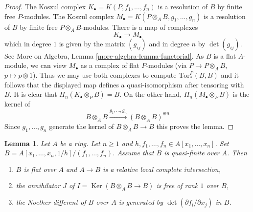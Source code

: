 \documentclass{stacks-project}
\theoremstyle{plain}
\newtheorem{lemma}[subsection]{Lemma}
\theoremstyle{definition}
\theoremstyle{remark}
\numberwithin{equation}{subsection}
\def\Ker{\mathop{\mathrm{Ker}}}
\begin{document}
\begin{proof}
The Koszul complex $K_\bullet = K(P, f_1, \ldots, f_n)$ is a resolution
of $B$ by finite free $P$-modules. The Koszul complex
$M_\bullet = K(P \otimes_A B, g_1, \ldots, g_n)$ is a resolution
of $B$ by finite free $P \otimes_A B$-modules. There is a map of
complexes
$$
K_\bullet \longrightarrow M_\bullet
$$
which in degree $1$ is given by the matrix $(g_{ij})$ and
in degree $n$ by $\det(g_{ij})$. See
More on Algebra, Lemma \ref{more-algebra-lemma-functorial}.
As $B$ is a flat $A$-module, we can view $M_\bullet$ as a complex
of flat $P$-modules (via $P \to P \otimes_A B$, $p \mapsto p \otimes 1$).
Thus we may use both complexes to compute $\text{Tor}_*^P(B, B)$ and
it follows that the displayed map defines a quasi-isomorphism after tensoring
with $B$. It is clear that $H_n(K_\bullet \otimes_P B) = B$.
On the other hand, $H_n(M_\bullet \otimes_P B)$ is the kernel of
$$
B \otimes_A B \xrightarrow{g_1, \ldots, g_n} (B \otimes_A B)^{\oplus n}
$$
Since $g_1, \ldots, g_n$ generate the kernel of $B \otimes_A B \to B$
this proves the lemma.
\end{proof}

\begin{lemma}
\label{lemma-quasi-finite-complete-intersection}
Let $A$ be a ring. Let $n \geq 1$ and
$h, f_1, \ldots, f_n \in A[x_1, \ldots, x_n]$.
Set $B = A[x_1, \ldots, x_n, 1/h]/(f_1, \ldots, f_n)$.
Assume that $B$ is quasi-finite over $A$.
Then
\begin{enumerate}
\item $B$ is flat over $A$ and $A \to B$ is a relative local complete
intersection,
\item the annihilator $J$ of $I = \Ker(B \otimes_A B \to B)$
is free of rank $1$ over $B$,
\item the Noether different of $B$ over $A$ is generated
by $\det(\partial f_i/\partial x_j)$ in $B$.
\end{enumerate}
\end{lemma}
\end{document}
